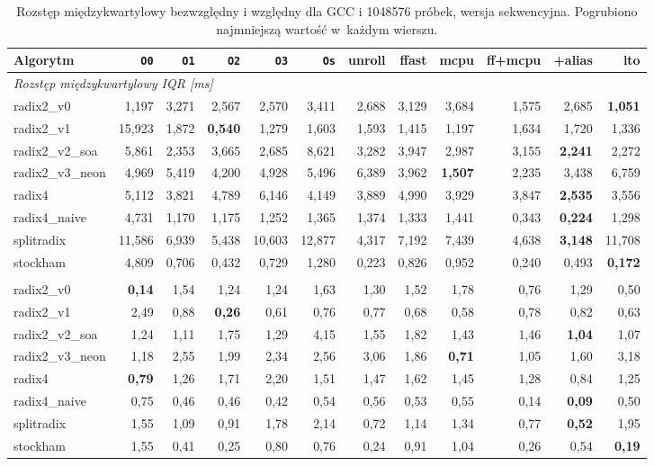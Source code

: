 \begin{table}[H]
\centering
\caption{Rozstęp międzykwartylowy bezwzględny i względny dla GCC i 1048576 próbek, wersja sekwencyjna. Pogrubiono najmniejszą wartość w~każdym wierszu.}\label{tab:iqr-gcc-1M}
\scriptsize
\setlength{\tabcolsep}{3.0pt}
\begin{tabular}{lrrrrrrrrrrr}
\toprule
Algorytm & \texttt{O0} & \texttt{O1} & \texttt{O2} & \texttt{O3} & \texttt{Os} & unroll & ffast & mcpu & ff+mcpu & +alias & lto \\
\midrule
\multicolumn{12}{l}{\textit{Rozstęp międzykwartylowy IQR [ms]}} \\[2pt]
radix2\_v0 & 1,197 & 3,271 & 2,567 & 2,570 & 3,411 & 2,688 & 3,129 & 3,684 & 1,575 & 2,685 & \textbf{1,051} \\
radix2\_v1 & 15,923 & 1,872 & \textbf{0,540} & 1,279 & 1,603 & 1,593 & 1,415 & 1,197 & 1,634 & 1,720 & 1,336 \\
radix2\_v2\_soa & 5,861 & 2,353 & 3,665 & 2,685 & 8,621 & 3,282 & 3,947 & 2,987 & 3,155 & \textbf{2,241} & 2,272 \\
radix2\_v3\_neon & 4,969 & 5,419 & 4,200 & 4,928 & 5,496 & 6,389 & 3,962 & \textbf{1,507} & 2,235 & 3,438 & 6,759 \\
radix4 & 5,112 & 3,821 & 4,789 & 6,146 & 4,149 & 3,889 & 4,990 & 3,929 & 3,847 & \textbf{2,535} & 3,556 \\
radix4\_naive & 4,731 & 1,170 & 1,175 & 1,252 & 1,365 & 1,374 & 1,333 & 1,441 & 0,343 & \textbf{0,224} & 1,298 \\
splitradix & 11,586 & 6,939 & 5,438 & 10,603 & 12,877 & 4,317 & 7,192 & 7,439 & 4,638 & \textbf{3,148} & 11,708 \\
stockham & 4,809 & 0,706 & 0,432 & 0,729 & 1,280 & 0,223 & 0,826 & 0,952 & 0,240 & 0,493 & \textbf{0,172} \\
\addlinespace
\multicolumn{12}{l}{\textit{Rozstęp względny IQR/mediana [\%]}} \\[2pt]
radix2\_v0 & \textbf{0,14} & 1,54 & 1,24 & 1,24 & 1,63 & 1,30 & 1,52 & 1,78 & 0,76 & 1,29 & 0,50 \\
radix2\_v1 & 2,49 & 0,88 & \textbf{0,26} & 0,61 & 0,76 & 0,77 & 0,68 & 0,58 & 0,78 & 0,82 & 0,63 \\
radix2\_v2\_soa & 1,24 & 1,11 & 1,75 & 1,29 & 4,15 & 1,55 & 1,82 & 1,43 & 1,46 & \textbf{1,04} & 1,07 \\
radix2\_v3\_neon & 1,18 & 2,55 & 1,99 & 2,34 & 2,56 & 3,06 & 1,86 & \textbf{0,71} & 1,05 & 1,60 & 3,18 \\
radix4 & \textbf{0,79} & 1,26 & 1,71 & 2,20 & 1,51 & 1,47 & 1,62 & 1,45 & 1,28 & 0,84 & 1,25 \\
radix4\_naive & 0,75 & 0,46 & 0,46 & 0,42 & 0,54 & 0,56 & 0,53 & 0,55 & 0,14 & \textbf{0,09} & 0,50 \\
splitradix & 1,55 & 1,09 & 0,91 & 1,78 & 2,14 & 0,72 & 1,14 & 1,34 & 0,77 & \textbf{0,52} & 1,95 \\
stockham & 1,55 & 0,41 & 0,25 & 0,80 & 0,76 & 0,24 & 0,91 & 1,04 & 0,26 & 0,54 & \textbf{0,19} \\
\bottomrule
\end{tabular}
\end{table}

